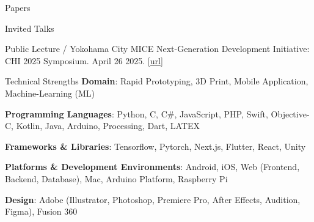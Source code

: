 \documentclass[
	11pt, %
]{resume} %
\begin{document}
\begin{rSection}{Papers}
    \begin{rSubsection}{Invited Talks}{}{}{}
		\item Public Lecture / Yokohama City MICE Next-Generation Development Initiative: CHI 2025 Symposium. April 26 2025. [\href{https://sigchi.jp/symposium/chi2025_symposium/}{url}]
	\end{rSubsection}

\end{rSection}

\begin{rSection}{Technical Strengths}
    \textbf{Domain}: Rapid Prototyping, 3D Print, Mobile Application, Machine-Learning (ML)

    \textbf{Programming Languages}:
    Python, C, C\#, JavaScript, PHP, Swift, Objective-C, Kotlin, Java, Arduino, Processing, Dart, LATEX

    \textbf{Frameworks \& Libraries}:
    Tensorflow, Pytorch, Next.js, Flutter, React, Unity
    
    \textbf{Platforms \& Development Environments}:
    Android, iOS, Web (Frontend, Backend, Database), Mac, Arduino Platform, Raspberry Pi

    \textbf{Design}:
    Adobe (Illustrator, Photoshop, Premiere Pro, After Effects, Audition, Figma), Fusion 360
\end{rSection}
\end{document}
